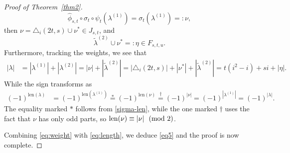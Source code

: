 \documentclass[12pt,reqno]{amsart}
\numberwithin{equation}{section}
\newcommand{\len}{\mathrm{len}}
\newcommand{\tpmod}[1]{\mkern 12mu(\textup{mod}\mkern 6mu #1)}
\begin{document}
\begin{proof}[Proof of Theorem~\ref{thm2}]
$$\hat{\phi}_{s,t}\circ\sigma_t\circ\psi_t(\lambda^{(1)}) = \sigma_t(\lambda^{(1)})=:\nu,$$
then $\nu=\triangle_i(2t,s)\cup \nu^*\in J_{s,t}$, and 
$$\tilde{\lambda}^{(2)}\cup \nu^*=:\eta \in F_{s,t,u}.$$
Furthermore, tracking the weights, we see that
\begin{align}
|\lambda| &= |\lambda^{(1)}|+|\lambda^{(2)}| = |\nu|+|\tilde{\lambda}^{(2)}|= |\triangle_i(2t,s)|+|\nu^*|+|\tilde{\lambda}^{(2)}|=t(i^2-i)+si+|\eta|.\label{eq:weight}
\end{align}
While the sign transforms as
\begin{align}
(-1)^{\len(\lambda)} &= (-1)^{\len(\lambda^{(1)})} \stackrel{*}{=} (-1)^{\len(\nu)} \stackrel{\dagger}{=} (-1)^{|\nu|} = (-1)^{|\lambda^{(1)}|} = (-1)^{|\lambda|}.\label{eq:length}
\end{align}
The equality marked $*$ follows from \eqref{sigma-len}, while the one marked $\dagger$ uses the fact that $\nu$ has only odd parts, so $\len(\nu)\equiv |\nu|\tpmod 2$.

Combining \eqref{eq:weight} with \eqref{eq:length}, we deduce \eqref{eq5} and the proof is now complete.
\end{proof}
\end{document}
